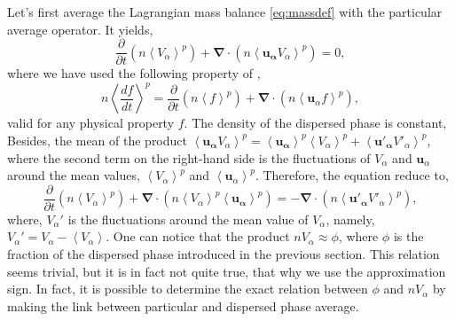 Let's first average the Lagrangian mass balance \ref{eq:massdef} with the particular average operator.
It yields,   
\begin{equation}
    \label{eq:LpolyMassCons}
    \frac{\partial }{\partial t}(n\left<V_\alpha\right>^p) 
    + \bm{\nabla}\cdot(n\left<\bm{u_\alpha}V_\alpha\right>^p)
    = 0,
\end{equation}  
where we have used the following property of \citep{anderson1967fluid},
\begin{equation*}
    n \left<\frac{d f}{dt}\right>^p 
    = \frac{\partial }{\partial t}(n\left<f\right>^p) 
    + \bm{\nabla}\cdot(n\left<\bm{u}_\alpha f\right>^p),
\end{equation*}
valid for any physical property $f$.
The density of the dispersed phase is constant,
Besides, the mean of the product $\left<\bm{u_\alpha}V_\alpha\right>^p = \left<\bm{u_\alpha}\right>^p\left<V_\alpha\right>^p+\left<\bm{u'_\alpha}V'_\alpha\right>^p$, where the second term on the right-hand side is the fluctuations of $V_\alpha$ and $\bm{u}_\alpha$ around the mean values, $\left<V_\alpha\right>^p$ and $\left<\bm{u}_\alpha\right>^p$. 
Therefore, the equation reduce to,
\begin{equation}
    \frac{\partial }{\partial t}(n\left<V_\alpha\right>^p) 
    + \bm{\nabla}\cdot(n\left<V_\alpha\right>^p\left<\bm{u_\alpha}\right>^p )
    = 
    - \bm{\nabla}\cdot(n\left<\bm{u'_\alpha}V'_\alpha\right>^p),
    \label{eq:pmassavg}
\end{equation}  
where, $V_\alpha'$ is the fluctuations around the mean value of $V_\alpha$,
namely, $V_\alpha' = V_\alpha - \left<V_\alpha\right>$.
One can notice that the product $nV_\alpha \approx \phi$, where $\phi$ is the fraction of the dispersed phase introduced in the previous section. 
This relation seems trivial, but it is in fact not quite true, that why we use the approximation sign. 
In fact, it is possible to determine the exact relation between $\phi$ and $nV_\alpha$ by making the link between particular and dispersed phase average.

